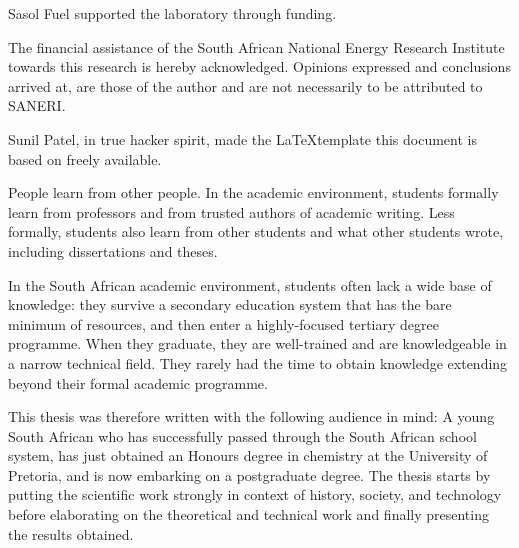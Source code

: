 \documentclass[
11pt, %
english, %
singlespacing, %
headsepline, %
]{MastersDoctoralThesis} %
\begin{document}
\begin{acknowledgements}
Sasol Fuel supported the laboratory through funding.

The financial assistance of the South African National Energy Research Institute
towards this research is hereby acknowledged. Opinions expressed and conclusions
arrived at, are those of the author and are not necessarily to be attributed to
SANERI.

Sunil Patel, in true hacker spirit, made the \LaTeX template this document is
based on freely available.


\end{acknowledgements}


\begin{preface}
\addchaptertocentry{\prefacename}

People learn from other people. In the academic environment, students formally
learn from professors and from trusted authors of academic writing. Less
formally, students also learn from other students and what other students
wrote, including dissertations and theses.

In the South African academic environment, students often lack a wide base of
knowledge: they survive a secondary education system that has the bare minimum
of resources, and then enter a highly-focused tertiary degree programme. When
they graduate, they are well-trained and are knowledgeable in a narrow technical
field. They rarely had the time to obtain knowledge extending beyond their
formal academic programme.

This thesis was therefore written with the following audience in mind: A young
South African who has successfully passed through the South African school
system, has just obtained an Honours degree in chemistry at the University of
Pretoria, and is now embarking on a postgraduate degree. The thesis starts by
putting the scientific work strongly in context of history, society, and
technology before elaborating on the theoretical and technical work and finally
presenting the results obtained.

\end{preface}

\end{document}
